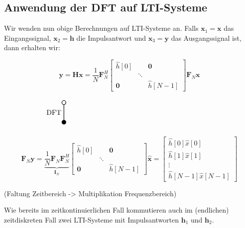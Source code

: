 \documentclass[11pt]{article}
\newcommand{\verticaltransform}[4]{%
    \begin{tikzpicture}
        \filldraw[thick] (0,0) circle (0.1) node[below=3pt] {$#4$};
        \draw[thick] (0,0.1) -- (0,#2 -0.1) node[midway, left] {#1};
        \draw[thick] (0,#2) circle (0.1) node[above=3pt] {$#3$};
    \end{tikzpicture}%
}
\begin{document}
\subsection*{Anwendung der DFT auf LTI-Systeme}
\vspace*{-0.5cm}

Wir wenden nun obige Berechnungen auf LTI-Systeme an. Falls $\mathbf{x}_1 = \mathbf{x}$ das Eingangssignal, $\mathbf{x}_2 = \mathbf{h}$ die Impulsantwort und $\mathbf{x}_3 = \mathbf{y}$ das Ausgangssignal ist, dann erhalten wir:

$$\mathbf{y} = \mathbf{H}\mathbf{x} =  \frac{1}{N} \mathbf{F}_N^H  \begin{bmatrix}
    \hat{h}[0] & & \mathbf{0} \\
    & \ddots & \\
    \mathbf{0} & & \hat{h}[N-1]
\end{bmatrix} \mathbf{F}_N \mathbf{x}$$
$$\verticaltransform{\text{DFT}}{1}{}{} \hspace{7.5cm}$$
$$\mathbf{F}_N \mathbf{y} = \underbrace{\frac{1}{N} \mathbf{F}_N \mathbf{F}_N^H}_{\mathbf{I}_N}  \begin{bmatrix}
    \hat{h}[0] & & \mathbf{0} \\
    & \ddots & \\
    \mathbf{0} & & \hat{h}[N-1]
\end{bmatrix} \hat{\mathbf{x}} = \begin{bmatrix}
    \hat{h}[0] \hat{x}[0] \\
    \hat{h}[1] \hat{x}[1] \\
    \vdots \\
    \hat{h}[N-1] \hat{x}[N-1]
\end{bmatrix}$$

(Faltung Zeitbereich -> Multiplikation Frequenzbereich)

Wie bereits im zeitkontinuierlichen Fall kommutieren auch im (endlichen) zeitdiskreten Fall zwei LTI-Systeme mit Impulsantworten $\mathbf{h}_1$ und $\mathbf{h}_2$.
\end{document}
